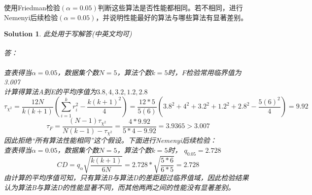\documentclass[a4paper,UTF8]{article}
\numberwithin{equation}{section}
\newtheorem*{mySol}{Solution}
\begin{document}
使用Friedman检验$(\alpha=0.05)$判断这些算法是否性能都相同。若不相同，进行Nemenyi后续检验$(\alpha=0.05)$，并说明性能最好的算法与哪些算法有显著差别。
\begin{mySol}
此处用于写解答(中英文均可)
~\\
~\\
答：\\
~\\
查表得当$\alpha = 0.05$，数据集个数$N = 5$，算法个数$k = 5$时，F检验常用临界值为3.007\\
计算得算法A到E的平均序值为$3.8,4,3.2,1.2,2.8$\\
\[
\tau_{\chi^2} 
= \frac{12N}{k(k+1)}(\sum^k_{i=1}{r_i^2}-\frac{k(k+1)^2}{4})
=\frac{12*5}{5(6)}(3.8^2+4^2+3.2^2+1.2^2+2.8^2-\frac{5(6)^2}{4})
=9.92
\]
\[
\tau_F 
= \frac{(N-1)\tau_{\chi^2}}{N(k-1)-\tau_{\chi^2}}
= \frac{4*9.92}{5*4-9.92}
= 3.9365 > 3.007 
\]
因此拒绝“所有算法性能相同”这个假设。下面进行Nemenyi后续检验：\\
查表得当$\alpha = 0.05$，数据集个数$N = 5$，算法个数$k = 5$时，
$q_{0.05}=2.728$\\
\[CD 	= q_{\alpha}\sqrt{\frac{k(k+1)}{6N}}
		= 2.728*\sqrt{\frac{5*6}{6*5}}
		= 2.728
		\]
由计算的平均序值可知，只有算法B与算法D的差距超过临界值域，因此检验结果认为算法B与算法D的性能显著不同，而其他两两之间的性能没有显著差别。
\end{mySol}

\newpage
\end{document}

